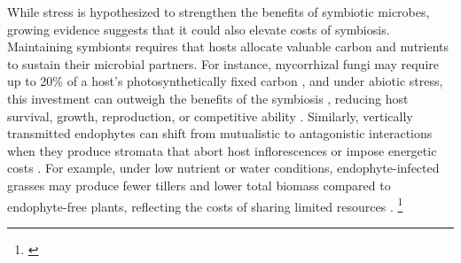 \documentclass[12pt]{article}\usepackage[]{graphicx}\usepackage[dvipsnames]{xcolor}
\newcommand{\tom}[2]{{\color{red}{#1}}\footnote{\textit{\color{red}{#2}}}}
\begin{document}
While stress is hypothesized to strengthen the benefits of symbiotic microbes, growing evidence suggests that it could also elevate costs of symbiosis.
Maintaining symbionts requires that hosts allocate valuable carbon and nutrients to sustain their microbial partners.
For instance, mycorrhizal fungi may require up to 20\% of a host's photosynthetically fixed carbon \citep{thirkell2020carbon,soudzilovskaia2015quantitative}, and under abiotic stress, this investment can outweigh the benefits of the symbiosis \citep{johnson1997functioning, bronstein2001exploitation}, reducing host survival, growth, reproduction, or competitive ability \citep{klironomos2003variation}. 
Similarly, vertically transmitted endophytes can shift from mutualistic to antagonistic interactions when they produce stromata that abort host inflorescences or impose energetic costs \citep{saikkonen2004evolution}. 
For example, under low nutrient or water conditions, endophyte-infected grasses may produce fewer tillers and lower total biomass compared to endophyte-free plants, reflecting the costs of sharing limited resources \citep{ahlholm2002vertically}. 
\tom{}{I think we need a sentence to close this paragraph that makes some broader point, that generates suspense, and that transitions to the next paragraph. Something about how we still don't know whether stress is more likely to elicit net benefits or net costs.}


\end{document}
